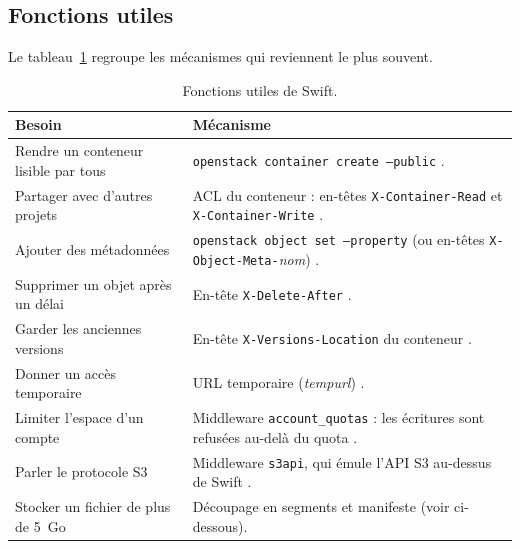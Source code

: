 \subsection{Fonctions utiles}\label{sec:sw-fonctions}

Le tableau~\ref{tab:sw-fonctions} regroupe les mécanismes qui reviennent le plus souvent.

\begin{table}[!ht]
\centering
\renewcommand{\arraystretch}{1.3}
\begin{tabular}{@{}>{\raggedright\arraybackslash}p{4.6cm}>{\raggedright\arraybackslash}p{10.9cm}@{}}
\toprule
\textbf{Besoin} & \textbf{Mécanisme} \\
\midrule
Rendre un conteneur lisible par tous & \texttt{openstack container create --public} \parencite{osc-container}. \\
Partager avec d'autres projets & ACL du conteneur : en-têtes \texttt{X-Container-Read} et \texttt{X-Container-Write} \parencite{swift-api-ref}. \\
Ajouter des métadonnées & \texttt{openstack object set --property} (ou en-têtes \texttt{X-Object-Meta-}\emph{nom}) \parencite{osc-object}. \\
Supprimer un objet après un délai & En-tête \texttt{X-Delete-After} \parencite{swift-api-ref}. \\
Garder les anciennes versions & En-tête \texttt{X-Versions-Location} du conteneur \parencite{swift-api-ref}. \\
Donner un accès temporaire & URL temporaire (\emph{tempurl}) \parencite{swift-api-ref}. \\
Limiter l'espace d'un compte & Middleware \texttt{account\_\allowbreak quotas} : les écritures sont refusées au-delà du quota \parencite{swift-middleware}. \\
Parler le protocole S3 & Middleware \texttt{s3api}, qui émule l'API S3 au-dessus de Swift \parencite{swift-middleware}. \\
Stocker un fichier de plus de 5~Go & Découpage en segments et manifeste (voir ci-dessous). \\
\bottomrule
\end{tabular}
\caption{Fonctions utiles de Swift.}
\label{tab:sw-fonctions}
\end{table}

